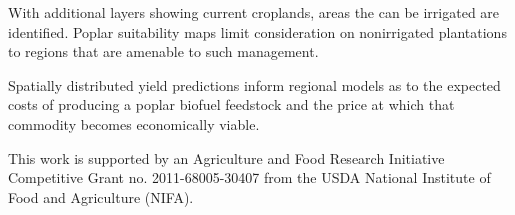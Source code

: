 \documentclass[preprint,12pt]{elsarticle}
\begin{document}
With additional layers showing current croplands, areas the can be
irrigated are identified.  Poplar suitability maps limit consideration
on nonirrigated plantations to regions that are amenable to such
management.

Spatially distributed yield predictions inform regional models as to
the expected costs of producing a poplar biofuel feedstock and the
price at which that commodity becomes economically viable.

This work is supported by an Agriculture and Food Research Initiative
Competitive Grant no. 2011-68005-30407 from the USDA National
Institute of Food and Agriculture (NIFA).



 






\end{document}
